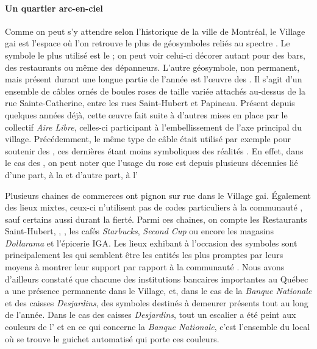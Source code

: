 \paragraph{Un quartier arc-en-ciel}
Comme on peut s'y attendre selon l'historique de la ville de Montréal, le Village gai est l'espace où l'on retrouve le plus de géosymboles reliés au spectre \lgbt{}.
Le symbole le plus utilisé est le  ; on peut voir celui-ci décorer autant pour des bars, des restaurants ou même des dépanneurs.
L'autre géosymbole, non permanent, mais présent durant une longue partie de l'année est l'œuvre des .
Il s'agit d'un ensemble de câbles ornés de boules roses de taille variée attachés au-dessus de la rue Sainte-Catherine, entre les rues Saint-Hubert et Papineau.
Présent depuis quelques années déjà, cette œuvre fait suite à d'autres mises en place par le collectif \emph{Aire Libre}, celles-ci participant à l'embellissement de l'axe principal du village.
Précédemment, le même type de câble était utilisé par exemple pour soutenir des , ces dernières étant moins symboliques des réalités \lgbt{}.
En effet, dans le cas des , on peut noter que l'usage du rose est depuis plusieurs décennies lié d'une part, à la  et d'autre part, à l'

Plusieurs chaines de commerces ont pignon sur rue dans le Village gai.
Également des lieux mixtes, ceux-ci n'utilisent pas de codes particuliers à la communauté \lgbt, sauf certains aussi durant la fierté.
Parmi ces chaines, on compte les Restaurants Saint-Hubert, ,
, les cafés \emph{Starbucks}, \emph{Second Cup} ou encore les
magasins \emph{Dollarama} et l'épicerie IGA\@.
Les lieux exhibant à l'occasion des symboles sont principalement les  qui semblent être les entités les plus promptes par leurs moyens à montrer leur support par rapport à la communauté \lgbt.
Nous avons d'ailleurs constaté que chacune des institutions bancaires importantes au Québec a une présence permanente dans le Village, et, dans le cas de la \emph{Banque Nationale} et des caisses \emph{Desjardins}, des symboles \lgbt{} destinés  à demeurer présents tout au long de l'année.
Dans le cas des caisses \emph{Desjardins}, tout un escalier a été peint aux couleurs de l' et en ce qui concerne la \emph{Banque Nationale}, c'est l'ensemble du local où se trouve le guichet automatisé qui porte ces couleurs.


